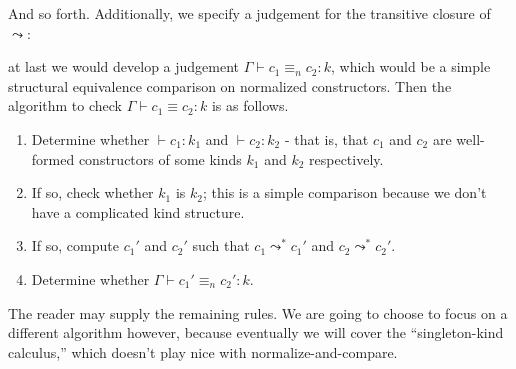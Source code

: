 \documentclass{amsart}
\newcommand{\type}{\ensuremath{\mathtt{type}}}
\begin{document}

And so forth. Additionally, we specify a judgement for the transitive closure of $\leadsto$:


at last we would develop a judgement $\Gamma \vdash c_1 \equiv_n c_2 : k$,
which would be a simple structural equivalence comparison on normalized
constructors. Then the algorithm to check $\Gamma \vdash c_1 \equiv c_2 : k$
is as follows.

\begin{enumerate}
    \item Determine whether $\vdash c_1 : k_1$ and $\vdash c_2 : k_2$ -
      that is, that $c_1$ and $c_2$ are well-formed constructors of some
      kinds $k_1$ and $k_2$ respectively.

    \item If so, check whether $k_1$ is $k_2$; this is a simple
      comparison because we don't have a complicated kind structure.

    \item If so, compute $c_1'$ and $c_2'$ such that $c_1 \leadsto^*
      c_1'$ and $c_2 \leadsto^* c_2'$.

    \item Determine whether $\Gamma \vdash c_1' \equiv_n c_2' : k$.
\end{enumerate}

The reader may supply the remaining rules. We are going to choose to focus on a
different algorithm however, because eventually we will cover the
``singleton-kind calculus,'' which doesn't play nice with normalize-and-compare.
\end{document}
